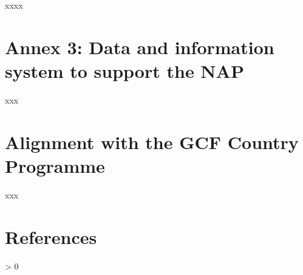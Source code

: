 \documentclass[
]{book}
\newlength{\cslhangindent}
\newenvironment{CSLReferences}[2] %
 {%
  \setlength{\parindent}{0pt}
  \ifodd #1 \everypar{\setlength{\hangindent}{\cslhangindent}}\ignorespaces\fi
  \ifnum #2 > 0
  \setlength{\parskip}{#2\baselineskip}
  \fi
 }%
 {}
\begin{document}
xxxx

\hypertarget{annex-3-data-and-information-system-to-support-the-nap}{%
\chapter{Annex 3: Data and information system to support the NAP}\label{annex-3-data-and-information-system-to-support-the-nap}}

xxx

\hypertarget{alignment-with-the-gcf-country-programme}{%
\chapter{Alignment with the GCF Country Programme}\label{alignment-with-the-gcf-country-programme}}

xxx

\hypertarget{references}{%
\chapter{References}\label{references}}

\hypertarget{refs}{}
\begin{CSLReferences}{0}{0}
\end{CSLReferences}

  
\end{document}
